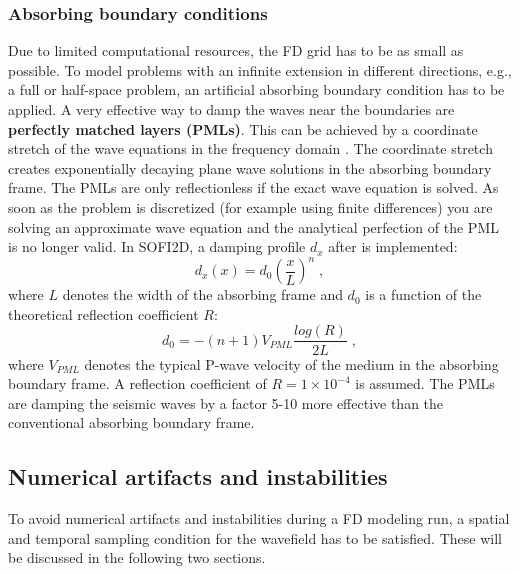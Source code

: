 \subsubsection{Absorbing boundary conditions}
Due to limited computational resources, the FD grid has to be as small as possible. To model problems with an infinite extension in different directions, e.g., a full or half-space problem,  an artificial absorbing boundary condition has to be applied. A very effective way to damp the waves near the boundaries are {\textbf{perfectly matched layers (PMLs)}}. This can be achieved by a coordinate stretch of the wave equations in the frequency domain \cite{komatitsch:07}. The coordinate stretch creates exponentially decaying plane wave solutions in the absorbing boundary frame. The PMLs are only reflectionless if the exact wave equation is solved. As soon as the problem is discretized (for example using finite differences) you are solving an approximate wave equation and the analytical perfection of the PML is no longer valid. In SOFI2D, a damping profile $d_x$ after \citet{collino2001application} is implemented:
\begin{equation}
    d_x(x) = d_0\left(\frac{x}{L}\right)^n\;,
\end{equation}
where $L$ denotes the width of the absorbing frame and $d_0$ is a function of the theoretical reflection coefficient $R$:
\begin{equation}
    d_0 = -\left(n+1\right) V_{PML}\frac{log(R)}{2L}\;,
\end{equation}
where $V_{PML}$ denotes the typical P-wave velocity of the medium in the absorbing boundary frame. A reflection coefficient of $R=1 \times 10^{-4}$ is assumed. The PMLs are damping the seismic waves by a factor 5-10 more effective than the conventional absorbing boundary frame.

\subsection{Numerical artifacts and instabilities}
\label{num_instab}
To avoid numerical artifacts and instabilities during a FD modeling run, a spatial and temporal sampling condition for the wavefield has to be satisfied. These will be discussed in the following two sections. 


